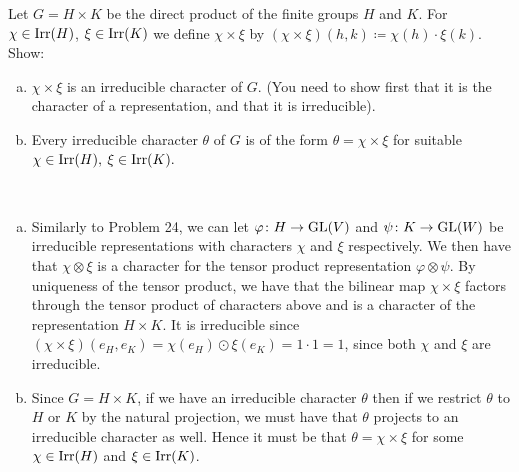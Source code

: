 \documentclass[leqno]{article}
\begin{document}
\newpage
\begin{problem}
Let $G=H\times K$ be the direct product of the finite groups $H$ and $K$. For $\chi \in \mathrm{Irr}(H)$, $\xi\in \mathrm{Irr}(K)$ we define $\chi \times \xi$ by $(\chi\times \xi)(h,k)\coloneqq \chi(h)\cdot \xi(k).$ Show:
\begin{enumerate}[(a)]
    \item $\chi\times \xi$ is an irreducible character of $G$. (You need to show first that it is the character of a representation, and that it is irreducible).
    \item Every irreducible character $\theta$ of $G$ is of the form $\theta = \chi \times \xi$ for suitable $\chi\in \mathrm{Irr}(H),$ $\xi\in \mathrm{Irr}(K).$
\end{enumerate}
\end{problem}
\begin{solution}~
\begin{enumerate}[(a)]
    \item Similarly to Problem 24, we can let $\varphi \colon H \to \mathrm{GL}(V)$ and $\psi \colon K \to \mathrm{GL}(W)$ be irreducible representations with characters $\chi$ and $\xi$ respectively.  We then have that $\chi \otimes \xi$ is a character for the tensor product representation $\varphi\otimes \psi$.  By uniqueness of the tensor product, we have that the bilinear map $\chi \times \xi$ factors through the tensor product of characters above and is a character of the representation $H\times K$.  It is irreducible since $(\chi \times \xi)(e_H,e_K)=\chi(e_H)\odot \xi(e_K)=1\cdot 1 = 1$, since both $\chi$ and $\xi$ are irreducible.
    \item Since $G=H\times K$, if we have an irreducible character $\theta$ then if we restrict $\theta$ to $H$ or $K$ by the natural projection, we must have that $\theta$ projects to an irreducible character as well. Hence it must be that $\theta = \chi \times \xi$ for some $\chi \in \mathrm{Irr}(H)$ and $\xi\in \mathrm{Irr}(K)$.
\end{enumerate}
\end{solution}
\end{document}
